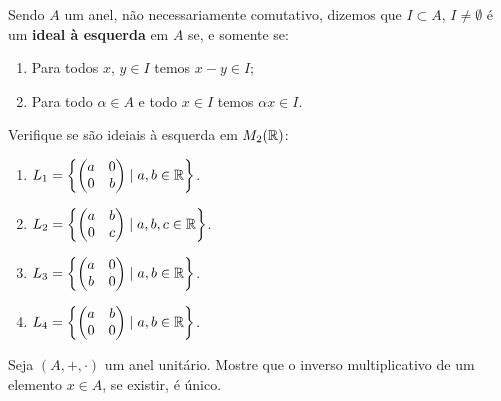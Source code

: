 \documentclass[12pt]{exam}
\begin{document}
    \vspace{.3cm}

    \questao{} Sendo $A$ um anel, n\~ao necessariamente comutativo, dizemos que $I \subset A$, $I \ne \emptyset$ \'e um \textbf{ideal \`a esquerda} em $A$ se, e somente se:
    \begin{enumerate}[label=({\roman*})]
        \item Para todos $x$, $y \in I$ temos $x - y \in I$;

        \item Para todo $\alpha \in A$ e todo $x \in I$ temos $\alpha x \in I$.
    \end{enumerate}

    Verifique se s\~ao ideiais \`a esquerda em $M_2(\mathbb{R})$:
    \begin{enumerate}[label=({\alph*})]
        \item $L_1 = \left\{\begin{pmatrix}
            a & 0\\
            0 & b
        \end{pmatrix} \mid a, b \in \mathbb{R}\right\}$.

        \item $L_2 = \left\{\begin{pmatrix}
            a & b\\
            0 & c
        \end{pmatrix} \mid a, b, c \in \mathbb{R}\right\}$.

        \item $L_3 = \left\{\begin{pmatrix}
            a & 0\\
            b & 0
        \end{pmatrix} \mid a, b \in \mathbb{R}\right\}$.

        \item $L_4 = \left\{\begin{pmatrix}
            a & b\\
            0 & 0
        \end{pmatrix} \mid a, b \in \mathbb{R}\right\}$.
    \end{enumerate}

    \vspace{.3cm}

    \questao{}  Seja $(A, +, \cdot)$ um anel unit\'ario. Mostre que o inverso multiplicativo de um elemento $x \in A$, se existir, \'e \'unico.

    \vspace{.3cm}
\end{document}
